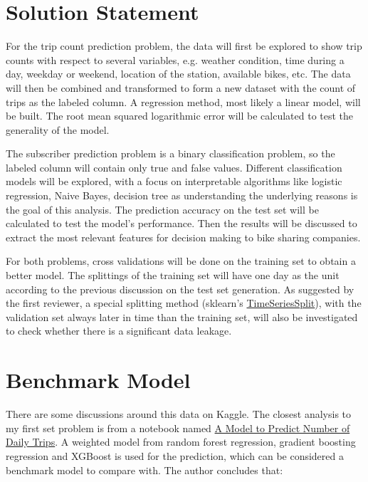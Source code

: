 \documentclass[a4paper]{article}
\begin{document}
	\section*{Solution Statement}
	
	For the trip count prediction problem, the data will first be explored to show trip counts with respect to several variables, e.g. weather condition, time during a day, weekday or weekend, location of the station, available bikes, etc. The data will then be combined and transformed to form a new dataset with the count of trips as the labeled column. A regression method, most likely a linear model, will be built. The root mean squared logarithmic error will be calculated to test the generality of the model.
	
	The subscriber prediction problem is a binary classification problem, so the labeled column will contain only true and false values. Different classification models will be explored, with a focus on interpretable algorithms like logistic regression, Naive Bayes, decision tree as understanding the underlying reasons is the goal of this analysis. The prediction accuracy on the test set will be calculated to test the model's performance. Then the results will be discussed to extract the most relevant features for decision making to bike sharing companies.
	
	For both problems, cross validations will be done on the training set to obtain a better model. The splittings of the training set will have one day as the unit according to the previous discussion on the test set generation. As suggested by the first reviewer, a special splitting method (sklearn's \href{http://scikit-learn.org/stable/modules/generated/sklearn.model_selection.TimeSeriesSplit.html}{TimeSeriesSplit}), with the validation set always later in time than the training set, will also be investigated to check whether there is a significant data leakage.
		
	\section*{Benchmark Model}
	
	There are some discussions around this data on Kaggle. The closest analysis to my first set problem is from a notebook named \href{https://www.kaggle.com/currie32/a-model-to-predict-number-of-daily-trips/notebook}{A Model to Predict Number of Daily Trips}. A weighted model from random forest regression, gradient boosting regression and XGBoost is used for the prediction, which can be considered a benchmark model to compare with. The author concludes that:
	
\end{document}
